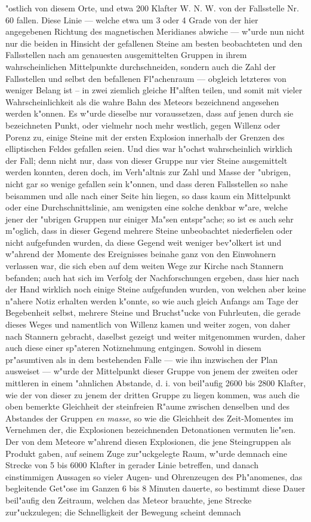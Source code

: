 \documentclass[a4paper, 11pt, oneside, german]{article}
\begin{document}
"ostlich von diesem Orte, und etwa 200 Klafter W. N. W. von der Fallsstelle Nr. 60 fallen. Diese Linie --- welche etwa um 3 oder 4 Grade von der hier angegebenen Richtung des magnetischen Meridianes abwiche --- w"urde nun nicht nur die beiden in Hinsicht der gefallenen Steine am besten beobachteten und den Fallsstellen nach am genauesten ausgemittelten Gruppen in ihrem wahrscheinlichen Mittelpunkte durchschneiden, sondern auch die Zahl der Fallsstellen und selbst den befallenen Fl"achenraum --- obgleich letzteres von weniger Belang ist -- in zwei ziemlich gleiche H"alften teilen, und somit mit vieler Wahrscheinlichkeit als die wahre Bahn des Meteors bezeichnend angesehen werden k"onnen. Es w"urde dieselbe nur voraussetzen, dass auf jenen durch sie bezeichneten Punkt, oder vielmehr noch mehr westlich, gegen Willenz oder Porenz zu, einige Steine mit der ersten Explosion innerhalb der Grenzen des elliptischen Feldes gefallen seien. Und dies war h"ochst wahrscheinlich wirklich der Fall; denn nicht nur, dass von dieser Gruppe nur vier Steine ausgemittelt werden konnten, deren doch, im Verh"altnis zur Zahl und Masse der "ubrigen, nicht gar so wenige gefallen sein k"onnen, und dass deren Fallsstellen so nahe beisammen und alle nach einer Seite hin liegen, so dass kaum ein Mittelpunkt oder eine Durchschnittslinie, am wenigsten eine solche denkbar w"are, welche jener der "ubrigen Gruppen nur einiger Ma"sen entspr"ache; so ist es auch sehr m"oglich, dass in dieser Gegend mehrere Steine unbeobachtet niederfielen oder nicht aufgefunden wurden, da diese Gegend weit weniger bev"olkert ist und w"ahrend der Momente des Ereignisses beinahe ganz von den Einwohnern verlassen war, die sich eben auf dem weiten Wege zur Kirche nach Stannern befanden; auch hat sich im Verfolg der Nachforschungen ergeben, dass hier nach der Hand wirklich noch einige Steine aufgefunden wurden, von welchen aber keine n"ahere Notiz erhalten werden k"onnte, so wie auch gleich Anfangs am Tage der Begebenheit selbst, mehrere Steine und Bruchst"ucke von Fuhrleuten, die gerade dieses Weges und namentlich von Willenz kamen und weiter zogen, von daher nach Stannern gebracht, daselbst gezeigt und weiter mitgenommen wurden, daher auch diese einer sp"ateren Notiznehmung entgingen. Sowohl in diesem pr"asumtiven als in dem bestehenden Falle --- wie ihn inzwischen der Plan ausweiset --- w"urde der Mittelpunkt dieser Gruppe von jenem der zweiten oder mittleren in einem "ahnlichen Abstande, d. i. von beil"aufig 2600 bis 2800 Klafter, wie der von dieser zu jenem der dritten Gruppe zu liegen kommen, was auch die oben bemerkte Gleichheit der steinfreien R"aume zwischen denselben und des Abstandes der Gruppen \emph{en masse}, so wie die Gleichheit des Zeit-Momentes im Vernehmen der, die Explosionen bezeichnenden Detonationen vermuten lie"sen. Der von dem Meteore w"ahrend diesen Explosionen, die jene Steingruppen als Produkt gaben, auf seinem Zuge zur"uckgelegte Raum, w"urde demnach eine Strecke von 5 bis 6000 Klafter in gerader Linie betreffen, und danach einstimmigen Aussagen so vieler Augen- und Ohrenzeugen des Ph"anomenes, das begleitende Get"ose im Ganzen 6 bis 8 Minuten dauerte, so bestimmt diese Dauer beil"aufig den Zeitraum, welchen das Meteor brauchte, jene Strecke zur"uckzulegen; die Schnelligkeit der Bewegung scheint demnach 
\end{document}
